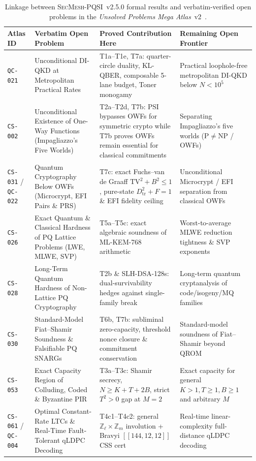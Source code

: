 \documentclass[11pt,reqno]{amsart}
\theoremstyle{definition}
\newcommand{\Z}{\mathbb{Z}}
\newcommand{\code}[1]{\texttt{\small #1}}
\begin{document}
\begin{table}[t]
\centering
\caption{Linkage between \textsc{SecMesh-PQSI}~v2.5.0 formal results and verbatim-verified open problems in the \emph{Unsolved Problems Mega Atlas}~v2~\cite{mega_atlas_2026}.}
\label{tab:frontier}
\footnotesize
\begin{tabularx}{\linewidth}{@{} >{\RaggedRight\arraybackslash}p{2.05cm} >{\RaggedRight\arraybackslash}p{4.05cm} Y Y@{}}
\toprule
\textbf{Atlas ID} & \textbf{Verbatim Open Problem} & \textbf{Proved Contribution Here} & \textbf{Remaining Open Frontier} \\
\midrule
\code{QC-021} & Unconditional DI-QKD at Metropolitan Practical Rates & T1a--T1e, T7a: quarter-circle duality, KL-QBER, composable 5-lane budget, Toner monogamy & Practical loophole-free metropolitan DI-QKD below $N{<}10^5$ \\
\code{CS-002} & Unconditional Existence of One-Way Functions (Impagliazzo's Five Worlds) & T2a--T2d, T7b: PSI bypasses OWFs for symmetric crypto while T7b proves OWFs remain essential for classical commitments & Separating Impagliazzo's five worlds ($\mathrm{P}\neq\mathrm{NP}$ / OWFs) \\
\code{CS-031} / \code{QC-022} & Quantum Cryptography Below OWFs (Microcrypt, EFI Pairs \& PRS) & T7c: exact Fuchs--van de Graaff $\mathrm{TV}^2{+}B^2\le 1$, pure-state $D_{\mathrm{tr}}^2{+}F=1$ \& EFI fidelity ceiling & Unconditional Microcrypt / EFI separation from classical OWFs \\
\code{CS-026} & Exact Quantum \& Classical Hardness of PQ Lattice Problems (LWE, MLWE, SVP) & T5a--T5c: exact algebraic soundness of ML-KEM-768 arithmetic & Worst-to-average MLWE reduction tightness \& SVP exponents \\
\code{CS-028} & Long-Term Quantum Hardness of Non-Lattice PQ Cryptography & T2b \& SLH-DSA-128s: dual-survivability hedges against single-family break & Long-term quantum cryptanalysis of code/isogeny/MQ families \\
\code{CS-030} & Standard-Model Fiat--Shamir Soundness \& Falsifiable PQ SNARGs & T6b, T7b: subliminal zero-capacity, threshold nonce closure \& commitment conservation & Standard-model soundness of Fiat--Shamir beyond QROM \\
\code{CS-053} & Exact Capacity Region of Colluding, Coded \& Byzantine PIR & T3a--T3c: Shamir secrecy, $N{\ge}K{+}T{+}2B$, strict $T^2{>}0$ gap at $M{=}2$ & Exact capacity for general $K{>}1, T{\ge}1, B{\ge}1$ and arbitrary $M$ \\
\code{CS-061} / \code{QC-004} & Optimal Constant-Rate LTCs \& Real-Time Fault-Tolerant qLDPC Decoding & T4c1--T4c2: general $\Z_\ell{\times}\Z_m$ involution + Bravyi $[[144,12,12]]$ CSS cert & Real-time linear-complexity full-distance qLDPC decoding \\

\end{tabularx}
\end{table}
\end{document}
